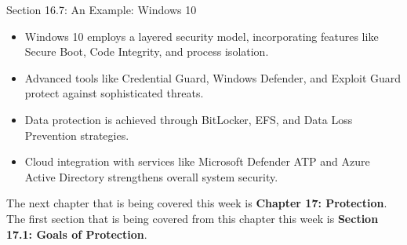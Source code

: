 \begin{notes}{Section 16.7: An Example: Windows 10}
    \begin{highlight}
        \begin{itemize}
            \item Windows 10 employs a layered security model, incorporating features like Secure Boot, Code Integrity, and process isolation.
            \item Advanced tools like Credential Guard, Windows Defender, and Exploit Guard protect against sophisticated threats.
            \item Data protection is achieved through BitLocker, EFS, and Data Loss Prevention strategies.
            \item Cloud integration with services like Microsoft Defender ATP and Azure Active Directory strengthens overall system security.
        \end{itemize}
    \end{highlight}
\end{notes}

The next chapter that is being covered this week is \textbf{Chapter 17: Protection}. The first section that is being covered from this chapter this week is \textbf{Section 17.1: Goals of Protection}.


